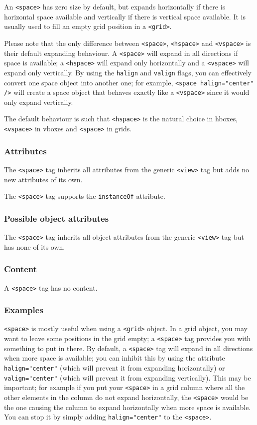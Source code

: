 An \texttt{<space>} has zero size by default, but expands horizontally
if there is horizontal space available and vertically if there is
vertical space available.  It is usually used to fill an empty grid
position in a \texttt{<grid>}.

Please note that the only difference between \texttt{<space>},
\texttt{<hspace>} and \texttt{<vspace>} is their default expanding
behaviour.  A \texttt{<space>} will expand in all directions if space
is available; a \texttt{<hspace>} will expand only horizontally and a
\texttt{<vspace>} will expand only vertically.  By using the
\texttt{halign} and \texttt{valign} flags, you can effectively convert
one space object into another one; for example, \texttt{<space
halign="center" />} will create a space object that behaves exactly
like a \texttt{<vspace>} since it would only expand vertically.

The default behaviour is such that \texttt{<hspace>} is the natural
choice in hboxes, \texttt{<vspace>} in vboxes and \texttt{<space>} in
grids.

\subsubsection{Attributes}
The \texttt{<space>} tag inherits all attributes from the generic
\texttt{<view>} tag but adds no new attributes of its own.

The \texttt{<space>} tag supports the \texttt{instanceOf} attribute.

\subsubsection{Possible object attributes}
The \texttt{<space>} tag inherits all object attributes from the
generic \texttt{<view>} tag but has none of its own.

\subsubsection{Content}
A \texttt{<space>} tag has no content.

\subsubsection{Examples}
\texttt{<space>} is mostly useful when using a \texttt{<grid>} object.
In a grid object, you may want to leave some positions in the grid
empty; a \texttt{<space>} tag provides you with something to put in
there.  By default, a \texttt{<space>} tag will expand in all
directions when more space is available; you can inhibit this by using
the attribute \texttt{halign="center"} (which will prevent it from
expanding horizontally) or \texttt{valign="center"} (which will
prevent it from expanding vertically).  This may be important; for
example if you put your \texttt{<space>} in a grid column where all
the other elements in the column do not expand horizontally, the
\texttt{<space>} would be the one causing the column to expand
horizontally when more space is available.  You can stop it by simply
adding \texttt{halign="center"} to the \texttt{<space>}.

